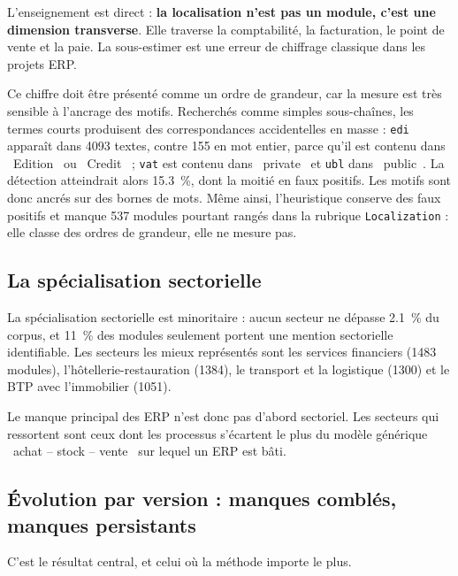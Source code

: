 \documentclass[11pt,a4paper]{article}
\begin{document}
L'enseignement est direct : \textbf{la localisation n'est pas un module, c'est
une dimension transverse}. Elle traverse la comptabilité, la facturation, le
point de vente et la paie. La sous-estimer est une erreur de chiffrage classique
dans les projets ERP.

Ce chiffre doit être présenté comme un ordre de grandeur, car la mesure est
très sensible à l'ancrage des motifs. Recherchés comme simples sous-chaînes,
les termes courts produisent des correspondances accidentelles en masse :
\texttt{edi} apparaît dans \num{4093} textes, contre \num{155} en mot entier,
parce qu'il est contenu dans \guillemotleft~Edition~\guillemotright{} ou
\guillemotleft~Credit~\guillemotright{} ; \texttt{vat} est contenu dans
\guillemotleft~private~\guillemotright{} et \texttt{ubl} dans
\guillemotleft~public~\guillemotright. La détection atteindrait alors
\SI{15.3}{\percent}, dont la moitié en faux positifs. Les motifs sont donc
ancrés sur des bornes de mots. Même ainsi, l'heuristique conserve des faux
positifs et manque \num{537} modules pourtant rangés dans la rubrique
\texttt{Localization} : elle classe des ordres de grandeur, elle ne mesure
pas.

\subsection{La spécialisation sectorielle}

La spécialisation sectorielle est minoritaire : aucun secteur ne dépasse
\SI{2.1}{\percent} du corpus, et \SI{11}{\percent} des modules seulement portent
une mention sectorielle identifiable. Les secteurs les mieux représentés sont
les services financiers (\num{1483} modules), l'hôtellerie-restauration
(\num{1384}), le transport et la logistique (\num{1300}) et le BTP avec
l'immobilier (\num{1051}).

Le manque principal des ERP n'est donc pas d'abord sectoriel. Les secteurs qui
ressortent sont ceux dont les processus s'écartent le plus du modèle générique
\guillemotleft~achat -- stock -- vente~\guillemotright{} sur lequel un ERP est
bâti.

\subsection{Évolution par version : manques comblés, manques persistants}
\label{sec:evolution}

C'est le résultat central, et celui où la méthode importe le plus.
\end{document}
